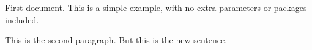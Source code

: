 \documentclass{article}
\begin{document}
First document.
This is a simple example,
with no extra parameters or packages included.

This is the second paragraph.
But this is the new sentence.
\end{document}
